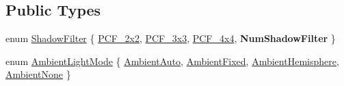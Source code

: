 \subsection*{Public Types}
\begin{DoxyCompactItemize}
\item 
enum \hyperlink{class_hlms_terrain_a241597775a6a483a2ba6cd02721d3715}{Shadow\+Filter} \{ \hyperlink{class_hlms_terrain_a241597775a6a483a2ba6cd02721d3715a53da265e876792e21375c4329c2c9278}{P\+C\+F\+\_\+2x2}, 
\hyperlink{class_hlms_terrain_a241597775a6a483a2ba6cd02721d3715a310366fdb0c573ae8e6e7f4692262d8f}{P\+C\+F\+\_\+3x3}, 
\hyperlink{class_hlms_terrain_a241597775a6a483a2ba6cd02721d3715a6806779daa76d206a6804c29261226a6}{P\+C\+F\+\_\+4x4}, 
{\bfseries Num\+Shadow\+Filter}
 \}
\item 
enum \hyperlink{class_hlms_terrain_a49e72052d5ccdc3b34459069c4496a49}{Ambient\+Light\+Mode} \{ \hyperlink{class_hlms_terrain_a49e72052d5ccdc3b34459069c4496a49ad9a05ccea7d12c88743f2f8ab51ef8f8}{Ambient\+Auto}, 
\hyperlink{class_hlms_terrain_a49e72052d5ccdc3b34459069c4496a49aaec6899680132f036c6488f85ee24c3f}{Ambient\+Fixed}, 
\hyperlink{class_hlms_terrain_a49e72052d5ccdc3b34459069c4496a49ac01b26f1199927c3e8cf94529d5ff132}{Ambient\+Hemisphere}, 
\hyperlink{class_hlms_terrain_a49e72052d5ccdc3b34459069c4496a49a38a630a926e8bae2fd0f278f02433d10}{Ambient\+None}
 \}
\end{DoxyCompactItemize}
